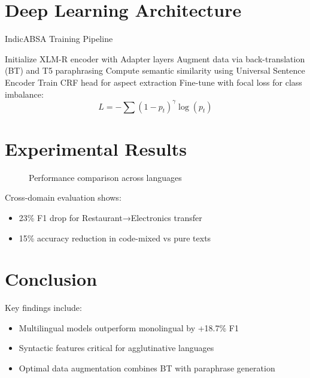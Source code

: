 \documentclass[12pt,a4paper]{article}
\begin{document}
\section{Deep Learning Architecture}
\label{sec:architecture}

\begin{algorithm}[H]
\caption{IndicABSA Training Pipeline}
\begin{algorithmic}[1]
\State Initialize XLM-R encoder with Adapter layers
\State Augment data via back-translation (BT) and T5 paraphrasing
\State Compute semantic similarity using Universal Sentence Encoder
\State Train CRF head for aspect extraction
\State Fine-tune with focal loss for class imbalance:
\begin{equation}
    L = -\sum (1-p_t)^\gamma \log(p_t)
\end{equation}
\end{algorithmic}
\end{algorithm}

\section{Experimental Results}
\label{sec:results}

\begin{figure}[ht]
    \centering
    \caption{Performance comparison across languages}
    \label{fig:results}
\end{figure}

Cross-domain evaluation shows:
\begin{itemize}
    \item 23\% F1 drop for Restaurant→Electronics transfer
    \item 15\% accuracy reduction in code-mixed vs pure texts
\end{itemize}

\section{Conclusion}
\label{sec:conclusion}

Key findings include:
\begin{itemize}
    \item Multilingual models outperform monolingual by +18.7\% F1
    \item Syntactic features critical for agglutinative languages
    \item Optimal data augmentation combines BT with paraphrase generation
\end{itemize}
\end{document}
